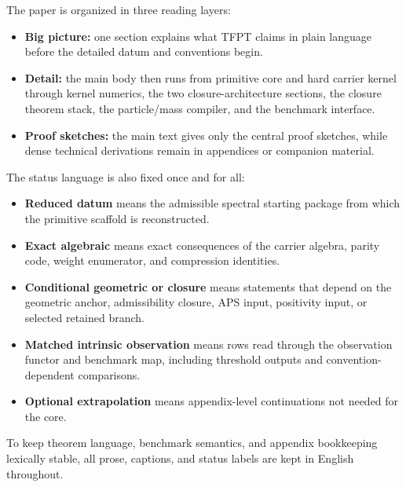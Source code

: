 \documentclass[11pt,a4paper]{article}
\theoremstyle{definition}
\theoremstyle{remark}
\begin{document}
The paper is organized in three reading layers:
\begin{itemize}[leftmargin=1.5em, topsep=3pt, itemsep=2pt]
    \item \textbf{Big picture:} one section explains what TFPT claims in plain language before the detailed datum and conventions begin.
    \item \textbf{Detail:} the main body then runs from primitive core and hard carrier kernel through kernel numerics, the two closure-architecture sections, the closure theorem stack, the particle/mass compiler, and the benchmark interface.
    \item \textbf{Proof sketches:} the main text gives only the central proof sketches, while dense technical derivations remain in appendices or companion material.
\end{itemize}
The status language is also fixed once and for all:
\begin{itemize}[leftmargin=1.5em, topsep=3pt, itemsep=2pt]
    \item \textbf{Reduced datum} means the admissible spectral starting package from which the primitive scaffold is reconstructed.
    \item \textbf{Exact algebraic} means exact consequences of the carrier algebra, parity code, weight enumerator, and compression identities.
    \item \textbf{Conditional geometric or closure} means statements that depend on the geometric anchor, admissibility closure, APS input, positivity input, or selected retained branch.
    \item \textbf{Matched intrinsic observation} means rows read through the observation functor and benchmark map, including threshold outputs and convention-dependent comparisons.
    \item \textbf{Optional extrapolation} means appendix-level continuations not needed for the core.
\end{itemize}
To keep theorem language, benchmark semantics, and appendix bookkeeping lexically stable, all prose, captions, and status labels are kept in English throughout.
\end{document}
